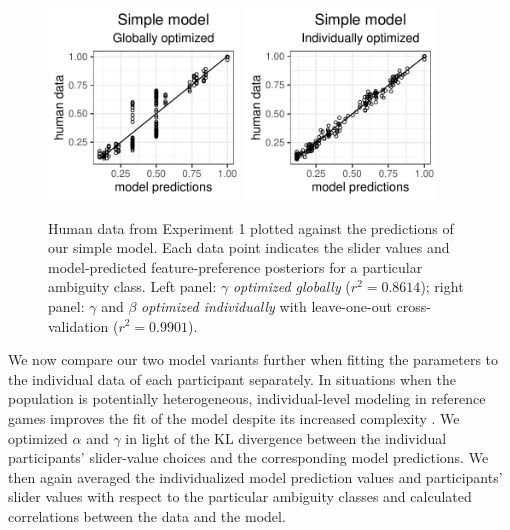 \documentclass[11pt,a4paper]{article}
\newcommand{\gcs}[1]{\textcolor{blue}{[gcs: #1]}}
\begin{document}
\begin{figure}[ht]
	\centering
	\includegraphics[width=2in]{images/m13.pdf}
	\includegraphics[width=2in]{images/m8.pdf}
		\caption{Human data from Experiment 1 plotted against the predictions of our simple model. %
		Each data point indicates the slider values and model-predicted feature-preference posteriors for a particular ambiguity class.
		Left panel: $\gamma$ \emph{optimized globally} ($r^2 = 0.8614$); 
		right panel: $\gamma$ and $\beta$ \emph{optimized individually} with leave-one-out cross-validation ($r^{2}=0.9901$).
	}
		\label{simple-global-and-cross-validated}
\end{figure}



We now compare our two model variants further when fitting the parameters to the individual data of each participant separately. In situations when the population is potentially heterogeneous, individual-level modeling in reference games improves the fit of the model despite its increased complexity \cite{franke2016reasoning}.
We optimized $\alpha$ and $\gamma$ in light of the KL divergence between the individual participants' slider-value choices and the corresponding model predictions.
We then again averaged the individualized model prediction values and participants' slider values with respect to the particular ambiguity classes and calculated correlations between the data and the model.
\end{document}
